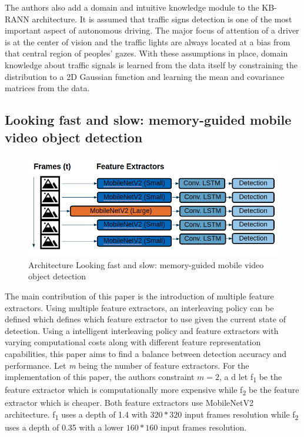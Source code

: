 \documentclass[conference]{IEEEtran}
\begin{document}
The authors also add a domain and intuitive knowledge module to the KB-RANN architecture. It is assumed that traffic signs detection is one of the most important aspect of autonomous driving. The major focus of attention of a driver is at the center of vision and the traffic lights are always located at a bias from that central region of peoples' gazes. With these assumptions in place, domain knowledge about traffic signals is learned from the data itself by constraining the distribution to a 2D Gaussian function and learning the mean and covariance matrices from the data. \newline

\subsection{Looking fast and slow: memory-guided mobile video object detection}
\begin{figure}[h]
\includegraphics[width=\columnwidth]{looking-fast-and-slow-architecture}
\caption{Architecture Looking fast and slow: memory-guided mobile video object detection}
\end{figure}
The main contribution of this paper is the introduction of multiple feature extractors. Using multiple feature extractors, an interleaving policy can be defined which defines which feature extractor to use given the current state of detection. Using a intelligent interleaving policy and feature extractors with varying computational costs along with different feature representation capabilities, this paper aims to find a balance between detection accuracy and performance. \newline
Let \textit{m} being the number of feature extractors. For the implementation of this paper, the authors constraint $\textit{m}=2$, a d let f\textsubscript{1} be the feature extractor which is computationally more expensive while f\textsubscript{2} be the feature extractor which is cheaper. Both feature extractors use MobileNetV2 architecture. f\textsubscript{1} uses a depth of 1.4 with $320*320$ input frames resolution while f\textsubscript{2} uses a depth of 0.35 with a lower $160*160$ input frames resolution. \newline
\end{document}
